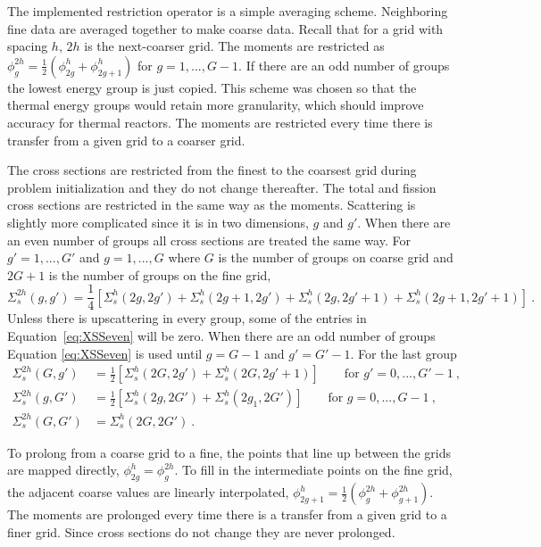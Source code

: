 The implemented restriction operator is a simple averaging scheme. Neighboring fine data are averaged together to make coarse data. Recall that for a grid with spacing $h$, $2h$ is the next-coarser grid. The moments are restricted as $\phi_{g}^{2h} = \frac{1}{2}(\phi_{2g}^{h} + \phi_{2g+1}^{h})$ for $g = 1,...,G-1$. If there are an odd number of groups the lowest energy group is just copied. This scheme was chosen so that the thermal energy groups would retain more granularity, which should improve accuracy for thermal reactors. The moments are restricted every time there is transfer from a given grid to a coarser grid.

The cross sections are restricted from the finest to the coarsest grid during problem initialization and they do not change thereafter. The total and fission cross sections are restricted in the same way as the moments. Scattering is slightly more complicated since it is in two dimensions, $g$ and $g'$. When there are an even number of groups all cross sections are treated the same way. For $g' = 1,..., G'$ and $g = 1, ..., G$ where $G$ is the number of groups on coarse grid and $2G+1$ is the number of groups on the fine grid,
\begin{equation}
  \Sigma_s^{2h}(g,g') = \frac{1}{4}[\Sigma_s^{h}(2g,2g') + \Sigma_s^{h}(2g+1,2g') + \Sigma_s^{h}(2g,2g'+1) + \Sigma_s^{h}(2g+1,2g'+1)] \:. 
  \label{eq:XSSeven}
\end{equation}
% 
Unless there is upscattering in every group, some of the entries in Equation~\eqref{eq:XSSeven} will be zero. When there are an odd number of groups Equation \eqref{eq:XSSeven} is used until $g=G-1$ and $g'=G'-1$. For the last group
  \begin{align}
    \Sigma^{2h}_s(G,g') &= \frac{1}{2}[\Sigma^{h}_s(2G,2g') + \Sigma^{h}_s(2G,2g'+1)] \qquad \text{for } g' = 0,...,G'-1 \:,\nonumber \\
    \Sigma^{2h}_s(g,G') &=  \frac{1}{2}[\Sigma^{h}_s(2g,2G') + \Sigma^{h}_s(2g_1,2G')] \qquad \text{for } g  = 0,...,G-1 \:,\nonumber \\
    \Sigma^{2h}_s(G,G') &= \Sigma^{h}_s(2G,2G') \nonumber \:.
  \end{align}

To prolong from a coarse grid to a fine, the points that line up between the grids are mapped directly, $\phi_{2g}^{h} = \phi_{g}^{2h}$. To fill in the intermediate points on the fine grid, the adjacent coarse values are linearly interpolated, $\phi_{2g+1}^{h} = \frac{1}{2}(\phi_{g}^{2h} + \phi_{g+1}^{2h})$. The moments are prolonged every time there is a transfer from a given grid to a finer grid. Since cross sections do not change they are never prolonged. 

